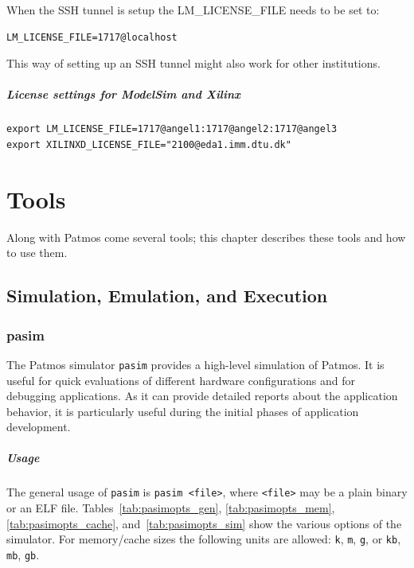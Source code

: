 \documentclass[a4paper,fontsize=10pt,twoside,DIV15,BCOR12mm,headinclude=true,footinclude=false,pagesize,bibtotoc]{scrbook}
\begin{document}
When the SSH tunnel is setup the LM\_LICENSE\_FILE needs to be set to:
\begin{verbatim}
LM_LICENSE_FILE=1717@localhost
\end{verbatim}

This way of setting up an SSH tunnel might also work for other institutions.

\paragraph{License settings for ModelSim and Xilinx}

\begin{verbatim}
export LM_LICENSE_FILE=1717@angel1:1717@angel2:1717@angel3
export XILINXD_LICENSE_FILE="2100@eda1.imm.dtu.dk"
\end{verbatim}





\chapter{Tools}

Along with Patmos come several tools; this chapter describes these
tools and how to use them.

\section{Simulation, Emulation, and Execution}

\subsection{pasim}

The Patmos simulator \texttt{pasim} provides a high-level simulation
of Patmos. It is useful for quick evaluations of different hardware
configurations and for debugging applications. As it can provide
detailed reports about the application behavior, it is particularly
useful during the initial phases of application development.

\paragraph{Usage} The general usage of \texttt{pasim} is \texttt{pasim
  <file>}, where \texttt{<file>} may be a plain binary or an ELF
file. Tables~\ref{tab:pasimopts_gen}, \ref{tab:pasimopts_mem},
\ref{tab:pasimopts_cache}, and~\ref{tab:pasimopts_sim} show the
various options of the simulator. For memory/cache sizes the following
units are allowed: \texttt{k}, \texttt{m}, \texttt{g}, or \texttt{kb},
\texttt{mb}, \texttt{gb}.
\end{document}
